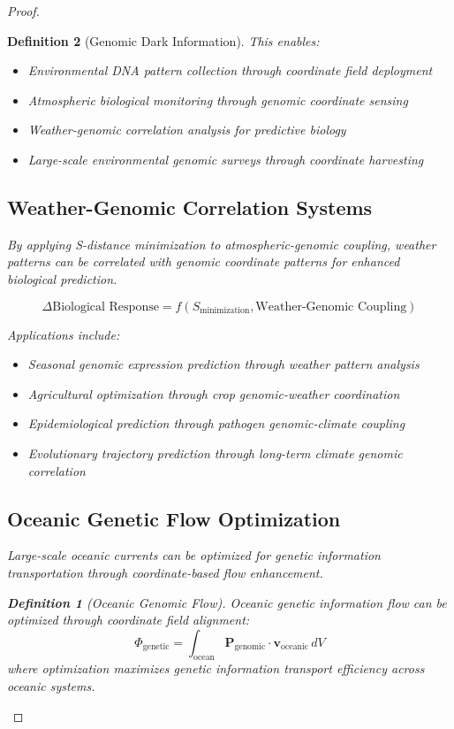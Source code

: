\documentclass[12pt,a4paper]{article}
\newtheorem{definition}{Definition}
\begin{document}
\begin{proof}
\begin{definition}[Genomic Dark Information]
This enables:
\begin{itemize}
\item Environmental DNA pattern collection through coordinate field deployment
\item Atmospheric biological monitoring through genomic coordinate sensing
\item Weather-genomic correlation analysis for predictive biology
\item Large-scale environmental genomic surveys through coordinate harvesting
\end{itemize}

\subsection{Weather-Genomic Correlation Systems}

By applying S-distance minimization to atmospheric-genomic coupling, weather patterns can be correlated with genomic coordinate patterns for enhanced biological prediction.

\begin{equation}
\Delta \text{Biological Response} = f(S_{\text{minimization}}, \text{Weather-Genomic Coupling})
\end{equation}

Applications include:
\begin{itemize}
\item Seasonal genomic expression prediction through weather pattern analysis
\item Agricultural optimization through crop genomic-weather coordination
\item Epidemiological prediction through pathogen genomic-climate coupling
\item Evolutionary trajectory prediction through long-term climate genomic correlation
\end{itemize}

\subsection{Oceanic Genetic Flow Optimization}

Large-scale oceanic currents can be optimized for genetic information transportation through coordinate-based flow enhancement.

\begin{definition}[Oceanic Genomic Flow]
Oceanic genetic information flow can be optimized through coordinate field alignment:
\begin{equation}
\Phi_{\text{genetic}} = \int_{\text{ocean}} \mathbf{P}_{\text{genomic}} \cdot \mathbf{v}_{\text{oceanic}} \, dV
\end{equation}
where optimization maximizes genetic information transport efficiency across oceanic systems.
\end{definition}


\end{definition}
\end{proof}
\end{document}

